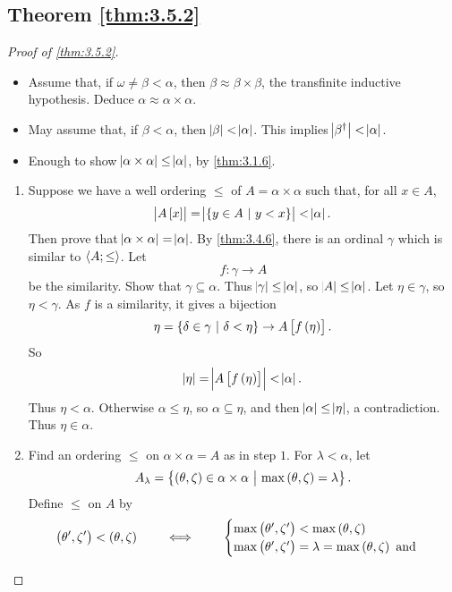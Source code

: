 \pagebreak

\subsection{Theorem \ref{thm:3.5.2}}

\begin{proof}[Proof of \ref{thm:3.5.2}]
\hfill
\begin{itemize}
\item Assume that, if $ \omega \ne \beta < \alpha $, then $ \beta \approx \beta \times \beta $, the transfinite inductive hypothesis. Deduce $ \alpha \approx \alpha \times \alpha $.
\item May assume that, if $ \beta < \alpha $, then $ \abs{\beta} < \abs{\alpha} $. This implies $ \abs{\beta^\dagger} < \abs{\alpha} $.
\item Enough to show $ \abs{\alpha \times \alpha} \le \abs{\alpha} $, by \ref{thm:3.1.6}.
\end{itemize}
\begin{enumerate}[leftmargin=0.5in, label=Step \arabic*.]
\item Suppose we have a well ordering $ \le $ of $ A = \alpha \times \alpha $ such that, for all $ x \in A $,
$$ \abs{A\sbr{x}} = \abs{\cbr{y \in A \st y < x}} < \abs{\alpha}. $$
Then prove that $ \abs{\alpha \times \alpha} = \abs{\alpha} $. By \ref{thm:3.4.6}, there is an ordinal $ \gamma $ which is similar to $ \abr{A; \le} $. Let
$$ f : \gamma \to A $$
be the similarity. Show that $ \gamma \subseteq \alpha $. Thus $ \abs{\gamma} \le \abs{\alpha} $, so $ \abs{A} \le \abs{\alpha} $. Let $ \eta \in \gamma $, so $ \eta < \gamma $. As $ f $ is a similarity, it gives a bijection
$$ \eta = \cbr{\delta \in \gamma \st \delta < \eta} \to A\sbr{f\br{\eta}}. $$
So
$$ \abs{\eta} = \abs{A\sbr{f\br{\eta}}} < \abs{\alpha}. $$
Thus $ \eta < \alpha $. Otherwise $ \alpha \le \eta $, so $ \alpha \subseteq \eta $, and then $ \abs{\alpha} \le \abs{\eta} $, a contradiction. Thus $ \eta \in \alpha $.
\item Find an ordering $ \le $ on $ \alpha \times \alpha = A $ as in step $ 1 $. For $ \lambda < \alpha $, let
$$ A_\lambda = \cbr{\br{\theta, \zeta} \in \alpha \times \alpha \st \max\br{\theta, \zeta} = \lambda}. $$
Define $ \le $ on $ A $ by
$$ \br{\theta', \zeta'} < \br{\theta, \zeta} \qquad \iff \qquad
\begin{cases}
\max\br{\theta', \zeta'} < \max\br{\theta, \zeta} \\
\max\br{\theta', \zeta'} = \lambda = \max\br{\theta, \zeta} \ \text{and}

\end{cases}$$
\end{enumerate}
\end{proof}
